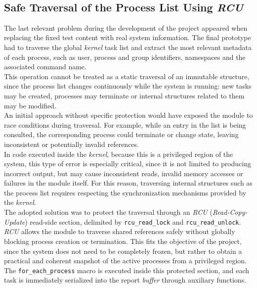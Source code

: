 \

\subsection{Safe Traversal of the Process List Using \textit{RCU}}

The last relevant problem during the development of the project appeared when replacing the fixed test content with real system information.
The final prototype had to traverse the global \textit{kernel} task list and extract the most relevant metadata of each process, such as user, process and group identifiers, namespaces and the associated command name.\\

This operation cannot be treated as a static traversal of an immutable structure, since the process list changes continuously while the system is running: new tasks may be created, processes may terminate or internal structures related to them may be modified.\\

An initial approach without specific protection would have exposed the module to race conditions during traversal.
For example, while an entry in the list is being consulted, the corresponding process could terminate or change state, leaving inconsistent or potentially invalid references.\\

In code executed inside the \textit{kernel}, because this is a privileged region of the system, this type of error is especially critical, since it is not limited to producing incorrect output, but may cause inconsistent reads, invalid memory accesses or failures in the module itself.
For this reason, traversing internal structures such as the process list requires respecting the synchronization mechanisms provided by the \textit{kernel}.\\

The adopted solution was to protect the traversal through an \textit{RCU} (\textit{Read-Copy-Update}) read-side section, delimited by \verb|rcu_read_lock| and \verb|rcu_read_unlock|.
\textit{RCU} allows the module to traverse shared references safely without globally blocking process creation or termination.
This fits the objective of the project, since the system does not need to be completely frozen, but rather to obtain a practical and coherent snapshot of the active processes from a privileged region.
The \verb|for_each_process| macro is executed inside this protected section, and each task is immediately serialized into the report \textit{buffer} through auxiliary functions.\\

